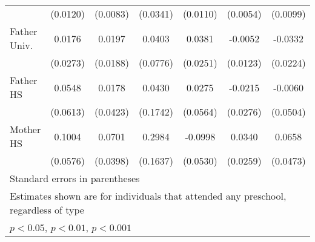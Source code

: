 \begin{table}[htbp]
\begin{tabular}{l*{6}{c}}
            &    (0.0120)         &    (0.0083)         &    (0.0341)         &    (0.0110)         &    (0.0054)         &    (0.0099)         \\
\addlinespace
Father Univ.&      0.0176         &      0.0197         &      0.0403         &      0.0381         &     -0.0052         &     -0.0332         \\
            &    (0.0273)         &    (0.0188)         &    (0.0776)         &    (0.0251)         &    (0.0123)         &    (0.0224)         \\
\addlinespace
Father HS   &      0.0548         &      0.0178         &      0.0430         &      0.0275         &     -0.0215         &     -0.0060         \\
            &    (0.0613)         &    (0.0423)         &    (0.1742)         &    (0.0564)         &    (0.0276)         &    (0.0504)         \\
\addlinespace
Mother HS   &      0.1004         &      0.0701         &      0.2984         &     -0.0998         &      0.0340         &      0.0658         \\
            &    (0.0576)         &    (0.0398)         &    (0.1637)         &    (0.0530)         &    (0.0259)         &    (0.0473)         \\
\bottomrule
\multicolumn{7}{l}{\footnotesize Standard errors in parentheses}\\
\multicolumn{7}{l}{\footnotesize Estimates shown are for individuals that attended any preschool, regardless of type}\\
\multicolumn{7}{l}{\footnotesize \sym{*} \(p<0.05\), \sym{**} \(p<0.01\), \sym{***} \(p<0.001\)}\\
\end{tabular}
\end{table}

